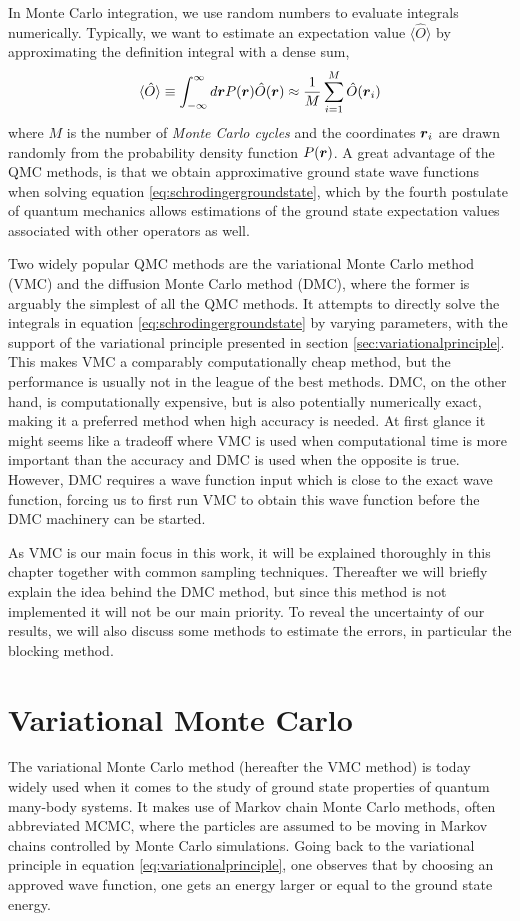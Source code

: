 In Monte Carlo integration, we use random numbers to evaluate integrals numerically. Typically, we want to estimate an expectation value $\langle\hat{O}\rangle$ by approximating the definition integral with a dense sum,
\begin{equation}
\langle \hat{O}\rangle\equiv\int_{-\infty}^{\infty}d\boldsymbol{{r}}P(\boldsymbol{{r}})\hat{O}(\boldsymbol{{r}})\approx\frac{1}{M}\sum_{i=1}^M\hat{O}(\boldsymbol{{r}}_i)
\label{eq:montecarlointegration}
\end{equation}
where $M$ is the number of \textit{Monte Carlo cycles} and the coordinates $\boldsymbol{{r}}_i$ are drawn randomly from the probability density function $P(\boldsymbol{{r}})$. A great advantage of the QMC methods, is that we obtain approximative ground state wave functions when solving equation \eqref{eq:schrodingergroundstate}, which by the fourth postulate of quantum mechanics allows estimations of the ground state expectation values associated with other operators as well. 

Two widely popular QMC methods are the variational Monte Carlo method (VMC) and the diffusion Monte Carlo method (DMC), where the former is arguably the simplest of all the QMC methods. It attempts to directly solve the integrals in equation \eqref{eq:schrodingergroundstate} by varying parameters, with the support of the variational principle presented in section \ref{sec:variationalprinciple}. This makes VMC a comparably computationally cheap method, but the performance is usually not in the league of the best methods. DMC, on the other hand, is computationally expensive, but is also potentially numerically exact, making it a preferred method when high accuracy is needed. At first glance it might seems like a tradeoff where VMC is used when computational time is more important than the accuracy and DMC is used when the opposite is true. However, DMC requires a wave function input which is close to the exact wave function, forcing us to first run VMC to obtain this wave function before the DMC machinery can be started.

As VMC is our main focus in this work, it will be explained thoroughly in this chapter together with common sampling techniques. Thereafter we will briefly explain the idea behind the DMC method, but since this method is not implemented it will not be our main priority. To reveal the uncertainty of our results, we will also discuss some methods to estimate the errors, in particular the blocking method.

\section{Variational Monte Carlo} \label{subsec:vmc}
The variational Monte Carlo method (hereafter the VMC method) is today widely used when it comes to the study of ground state properties of quantum many-body systems. It makes use of Markov chain Monte Carlo methods, often abbreviated MCMC, where the particles are assumed to be moving in Markov chains controlled by Monte Carlo simulations. Going back to the variational principle in equation \eqref{eq:variationalprinciple}, one observes that by choosing an approved wave function, one gets an energy larger or equal to the ground state energy.

